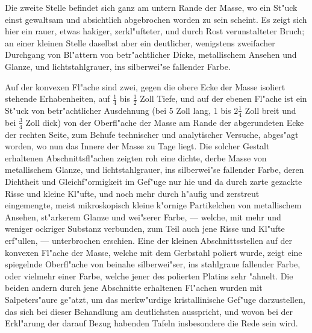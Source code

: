 \documentclass[a4paper, 11pt, oneside, german]{article}
\begin{document}
Die zweite Stelle befindet sich ganz am untern Rande der Masse, wo ein St"uck einst gewaltsam und absichtlich abgebrochen worden zu sein scheint. Es zeigt sich hier ein rauer, etwas hakiger, zerkl"ufteter, und durch Rost verunstalteter Bruch; an einer kleinen Stelle daselbst aber ein deutlicher, wenigstens zweifacher Durchgang von Bl"attern von betr"achtlicher Dicke, metallischem Ansehen und Glanze, und lichtstahlgrauer, ins silberwei"se fallender Farbe.

Auf der konvexen Fl"ache sind zwei, gegen die obere Ecke der Masse isoliert stehende Erhabenheiten, auf $\frac{1}{4}$ bis $\frac{1}{2}$ Zoll Tiefe, und auf der ebenen Fl"ache ist ein St"uck von betr"achtlicher Ausdehnung (bei 5 Zoll lang, 1 bis $2\frac{1}{4}$ Zoll breit und bei $\frac{3}{4}$ Zoll dick) von der Oberfl"ache der Masse am Rande der abgerundeten Ecke der rechten Seite, zum Behufe technischer und analytischer Versuche, abges"agt worden, wo nun das Innere der Masse zu Tage liegt. Die solcher Gestalt erhaltenen Abschnittsfl"achen zeigten roh eine dichte, derbe Masse von metallischem Glanze, und lichtstahlgrauer, ins silberwei"se fallender Farbe, deren Dichtheit und Gleichf"ormigkeit im Gef"uge nur hie und da durch zarte gezackte Risse und kleine Kl"ufte, und noch mehr durch h"aufig und zerstreut eingemengte, meist mikroskopisch kleine k"ornige Partikelchen von metallischem Ansehen, st"arkerem Glanze und wei"serer Farbe, --- welche, mit mehr und weniger ockriger Substanz verbunden, zum Teil auch jene Risse und Kl"ufte erf"ullen, --- unterbrochen erschien. Eine der kleinen Abschnittsstellen auf der konvexen Fl"ache der Masse, welche mit dem Gerbstahl poliert wurde, zeigt eine spiegelnde Oberfl"ache von beinahe silberwei"ser, ins stahlgraue fallender Farbe, oder vielmehr einer Farbe, welche jener des polierten Platins sehr "ahnelt. Die beiden andern durch jene Abschnitte erhaltenen Fl"achen wurden mit Salpeters"aure ge"atzt, um das merkw"urdige kristallinische Gef"uge darzustellen, das sich bei dieser Behandlung am deutlichsten ausspricht, und wovon bei der Erkl"arung der darauf Bezug habenden Tafeln insbesondere die Rede sein wird.
\end{document}
